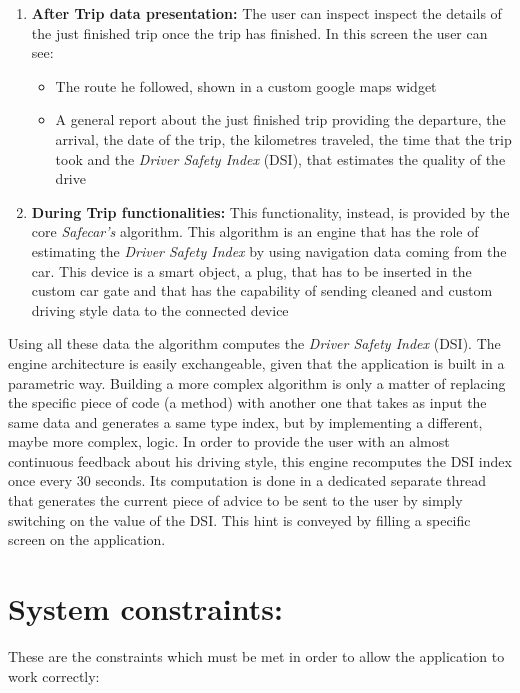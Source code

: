 \begin{enumerate}
	\item \textbf{After Trip data presentation:} The user can inspect inspect the details of the just finished trip once the trip has finished. In this screen the user can see:
	\begin{itemize}
		\item The route he followed, shown in a custom google maps widget
		\item A general report about the just finished trip providing the departure, the arrival, the date of the trip, the kilometres traveled, the time that the trip took and the \textit{Driver Safety Index} (DSI), that estimates the quality of the drive
	\end{itemize}
	\item \textbf{During Trip functionalities:} This functionality, instead, is provided by the core \textit{Safecar's} algorithm. This algorithm is an engine that has the role of estimating the \textit{Driver Safety Index} by using navigation data coming from the car. This device is a smart object, a plug, that has to be inserted in the custom car gate and that has the capability of sending cleaned and custom driving style data to the connected device
\end{enumerate}
Using all these data the algorithm computes the \textit{Driver Safety Index} (DSI). The engine architecture is easily exchangeable, given that the application is built in a parametric way. Building a more complex algorithm is only a matter of replacing the specific piece of code (a method) with another one that takes as input the same data and generates a same type index, but by implementing a different, maybe more complex, logic.
In order to provide the user with an almost continuous feedback about his driving style, this engine recomputes the DSI index once every 30 seconds.
Its computation is done in a dedicated separate thread that generates the current piece of advice to be sent to the user by simply switching on the value of the DSI. This hint is conveyed by filling a specific screen on the application.

\clearpage
\section{System constraints:}
These are the constraints which must be met in order to allow the application to work correctly:

